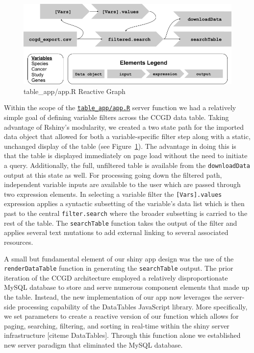\documentclass[10pt]{report}
\begin{document}
\begin{figure}[H]
    \centering
    \includegraphics[width=\textwidth]{figs/g238.png}
    \caption{table\_app/app.R Reactive Graph}\label{fig:reactiveGraph}
\end{figure}

Within the scope of the \href{https://github.com/ctastad/ccgd/blob/master/table_app/app.R}{\texttt{table\_app/app.R}} server function we had a relatively simple goal of defining variable filters across the CCGD data table. Taking advantage of Rshiny's modularity, we created a two state path for the imported data object that allowed for both a variable-specific filter step along with a static, unchanged display of the table (see Figure~\ref{fig:reactiveGraph}). The advantage in doing this is that the table is displayed immediately on page load without the need to initiate a query. Additionally, the full, unfiltered table is available from the \texttt{downloadData} output at this state as well. For processing going down the filtered path, independent variable inputs are available to the user which are passed through two expression elements. In selecting a variable filter the \texttt{[Vars].values} expression applies a syntactic subsetting of the variable's data list which is then past to the central \texttt{filter.search} where the broader subsetting is carried to the rest of the table. The \texttt{searchTable} function takes the output of the filter and applies several text mutations to add external linking to several associated resources.

A small but fundamental element of our shiny app design was the use of the \texttt{renderDataTable} function in generating the \texttt{searchTable} output. The prior iteration of the CCGD architecture employed a relatively disproportionate MySQL database to store and serve numerous component elements that made up the table. Instead, the new implementation of our app now leverages the server-side processing capability of the DataTables JavaScript library. More specifically, we set parameters to create a reactive version of our function which allows for paging, searching, filtering, and sorting in real-time within the shiny server infrastructure [citeme DataTables]. Through this function alone we established new server paradigm that eliminated the MySQL database.
\end{document}
